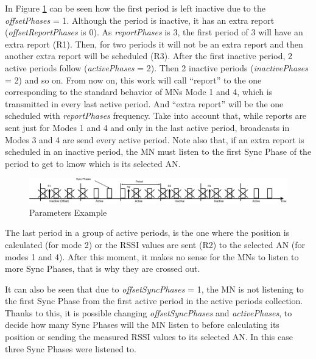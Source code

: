 In Figure \ref{fig:parametersphases} can be seen how the first period is left inactive due to the \textit{offsetPhases} = 1. Although the period
is inactive, it has an extra report (\textit{offsetReportPhases} is 0). As \textit{reportPhases} is 3, the first period of 3 will have an extra report (R1). 
Then, for two periods it will not be an extra report and then another extra report will be scheduled (R3). After the first inactive period, 2 active 
periods follow (\textit{activePhases} = 2). Then 2 inactive periods (\textit{inactivePhases} = 2) and so on. From now on, this work will call ``report'' to the one 
corresponding to the standard behavior of \acp{MN} Mode 1 and 4, which is transmitted in every last active period. And ``extra report'' will be 
the one scheduled with \textit{reportPhases} frequency. Take into account that, while reports are sent just for Modes 1 and 4 and only in the last active period,
broadcasts in Modes 3 and 4 are send every active period. Note also that, if an extra report is scheduled in an inactive period, the \ac{MN} must
listen to the first Sync Phase of the period to get to know which is its selected \ac{AN}.

\begin{figure}[H]
 \begin{center}
  \includegraphics[width=1\textwidth]{parametersphases.eps}
 \end{center}
 \caption{Parameters Example}
 \label{fig:parametersphases}
\end{figure}

The last period in a group of active periods, is the one where the position is calculated (for mode 2) or the \ac{RSSI} values are sent (R2) to the selected 
\ac{AN} (for modes 1 and 4). After this moment, it makes no sense for the \acp{MN} to listen to more Sync Phases, that is why they are crossed out. 

It can also be seen that due to \textit{offsetSyncPhases} = 1, the \ac{MN} is not listening to the first Sync Phase from the first active period in the active
periods collection. Thanks to this, it is possible changing \textit{offsetSyncPhases} and \textit{activePhases}, to decide how many Sync Phases will the \ac{MN}
listen to before calculating its position or sending the measured \ac{RSSI} values to its selected \ac{AN}. In this case three Sync Phases were listened to.

